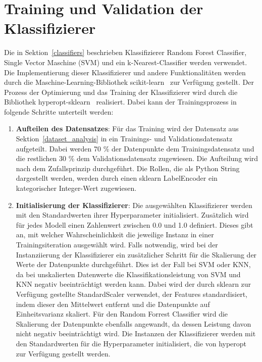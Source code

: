 \section{Training und Validation der Klassifizierer}

Die in Sektion~\ref{classifiers} beschrieben Klassifizierer Random Forest Classifier, Single Vector Maschine (SVM) und ein k-Nearest-Classifier werden verwendet.
Die Implementierung dieser Klassifizierer und andere Funktionalitäten werden durch die Maschine-Learning-Bibliothek scikit-learn~\cite{scikit-learn} zur Verfügung gestellt.
Der Prozess der Optimierung und das Training der Klassifizierer wird durch die Bibliothek hyperopt-sklearn~\cite{Komer2019} realisiert. 
Dabei kann der Trainingsprozess in folgende Schritte unterteilt werden:

\begin{enumerate}
    \item \textbf{Aufteilen des Datensatzes}: Für das Training wird der Datensatz aus Sektion~\ref{dataset_analysis} in ein Trainings- und Validationsdatensatz aufgeteilt. Dabei werden 70 \% der Datenpunkte dem Trainingsdatensatz und die restlichen 30 \% dem Validationsdatensatz zugewiesen.
    Die Aufteilung wird nach dem Zufallsprinzip durchgeführt. Die Rollen, die als Python String dargestellt werden, werden durch einen sklearn LabelEncoder ein kategorischer Integer-Wert zugewiesen. 
    \item \textbf{Initialisierung der Klassifizierer}: Die ausgewählten Klassifizierer werden mit den Standardwerten ihrer Hyperparameter initialisiert.
    Zusätzlich wird für jedes Modell einen Zahlenwert zwischen 0.0 und 1.0 definiert. Dieses gibt an, mit welcher Wahrscheinlichkeit die jeweilige Instanz in einer Trainingsiteration ausgewählt wird. Falls notwendig, wird bei der Instanziierung der Klassifizierer ein zusätzlicher Schritt für die Skalierung der Werte der Datenpunkte durchgeführt.
    Dies ist der Fall bei SVM oder KNN, da bei unskalierten Datenwerte die Klassifikationsleistung von SVM und KNN negativ beeinträchtigt werden kann. Dabei wird der durch sklearn zur Verfügung gestellte StandardScaler verwendet, der Features standardisiert, indem dieser den Mittelwert entfernt und die Datenpunkte auf Einheitsvarianz skaliert. Für den Random Forrest Classifier wird die Skalierung der Datenpunkte ebenfalls angewandt, da dessen Leistung davon nicht negativ beeinträchtigt wird.
    Die Instanzen der Klassifizierer werden mit den Standardwerten für die Hyperparameter initialisiert, die von hyperopt zur Verfügung gestellt werden.

\end{enumerate}
